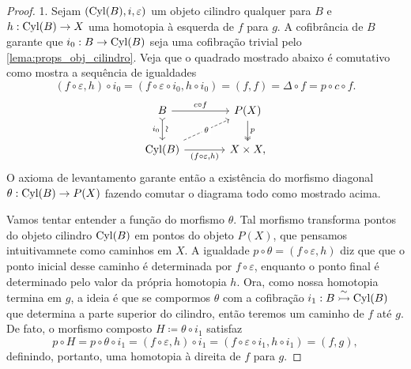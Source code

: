\begin{proof}
  1. Sejam $(\mathrm{Cyl}(B),i,\varepsilon)$ um objeto cilindro qualquer para $B$ e $h: \mathrm{Cyl}(B) \to X$ uma homotopia à esquerda de $f$ para $g$.
  A cofibrância de $B$ garante que $i_{0}: B \to \mathrm{Cyl}(B)$ seja uma cofibração trivial pelo \cref{lema:props_obj_cilindro}.
  Veja que o quadrado mostrado abaixo é comutativo como mostra a sequência de igualdades
  \begin{displaymath}
    (f \circ \varepsilon,h) \circ i_{0} = (f \circ \varepsilon \circ i_{0}, h \circ i_{0}) = (f,f) = \Delta \circ f = p \circ c \circ f.
  \end{displaymath}
  \begin{displaymath}
    \begin{tikzcd}[column sep=1.3cm]
      B
      \arrow[d, tail, "i_{0}" {swap}, "\sim" {sloped}]
      \arrow[r, "c \circ f"]
      & P(X)
      \arrow[d, two heads, "p"]
      \\ \Cyl(B)
      \arrow[r, "{(f \circ \varepsilon, h)}" swap]
      \arrow[ru, dashed, "\theta" description]
      & X \times X,
    \end{tikzcd}
  \end{displaymath}
  O axioma de levantamento garante então a existência do morfismo diagonal $\theta: \mathrm{Cyl}(B) \to P(X)$ fazendo comutar o diagrama todo como mostrado acima.

  Vamos tentar entender a função do morfismo $\theta$.
  Tal morfismo transforma pontos do objeto cilindro $\mathrm{Cyl}(B)$ em pontos do objeto $P(X)$, que pensamos intuitivamnete como caminhos em $X$.
  A igualdade $p \circ \theta = (f \circ \varepsilon,h)$ diz que que o ponto inicial desse caminho é determinada por $f \circ \varepsilon$, enquanto o ponto final é determinado pelo valor da própria homotopia $h$.
  Ora, como nossa homotopia termina em $g$, a ideia é que se compormos $\theta$ com a cofibração $i_{1}: B \overset{\sim}{\rightarrowtail} \mathrm{Cyl}(B)$ que determina a parte superior do cilindro, então teremos um caminho de $f$ até $g$.
  De fato, o morfismo composto $H \coloneqq \theta \circ i_{1}$ satisfaz
  \begin{displaymath}
    p \circ H
    = p \circ \theta \circ i_{1}
    = (f \circ \varepsilon,h) \circ i_{1}
    = (f \circ \varepsilon \circ i_{1}, h \circ i_{1})
    = (f,g),
  \end{displaymath}
  definindo, portanto, uma homotopia à direita de $f$ para $g$.


\end{proof}
